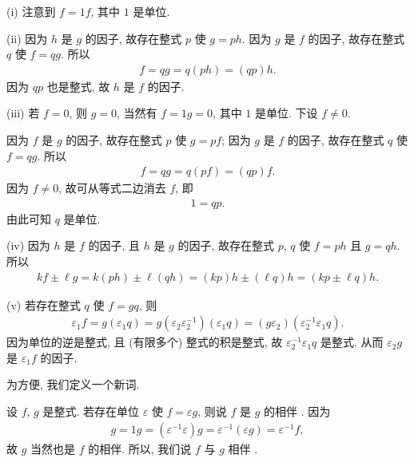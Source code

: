 \begin{pf}
    (i) 注意到 $f = 1f$, 其中 $1$ 是单位.

    (ii) 因为 $h$ 是 $g$ 的因子, 故存在整式 $p$ 使 $g = ph$. 因为 $g$ 是 $f$ 的因子, 故存在整式 $q$ 使 $f = qg$. 所以
    \begin{align*}
        f = qg = q(ph) = (qp)h.
    \end{align*}
    因为 $qp$ 也是整式, 故 $h$ 是 $f$ 的因子.

    (iii) 若 $f = 0$, 则 $g = 0$, 当然有 $f = 1 g = 0$, 其中 $1$ 是单位. 下设 $f \neq 0$.

    因为 $f$ 是 $g$ 的因子, 故存在整式 $p$ 使 $g = pf$; 因为 $g$ 是 $f$ 的因子, 故存在整式 $q$ 使 $f = qg$. 所以
    \begin{align*}
        f = qg = q(pf) = (qp)f.
    \end{align*}
    因为 $f \neq 0$, 故可从等式二边消去 $f$, 即
    \begin{align*}
        1 = qp.
    \end{align*}
    由此可知 $q$ 是单位.

    (iv) 因为 $h$ 是 $f$ 的因子, 且 $h$ 是 $g$ 的因子, 故存在整式 $p$, $q$ 使 $f = ph$ 且 $g = qh$. 所以
    \begin{align*}
        kf \pm \ell g = k(ph) \pm \ell (qh) = (kp) h \pm (\ell q) h = (kp \pm \ell q) h.
    \end{align*}

    (v) 若存在整式 $q$ 使 $f = gq$, 则
    \begin{align*}
        \varepsilon_1 f = g(\varepsilon_1 q) = g(\varepsilon_2 \varepsilon_2^{-1}) (\varepsilon_1 q) = (g\varepsilon_2) (\varepsilon_2^{-1} \varepsilon_1 q).
    \end{align*}
    因为单位的逆是整式, 且 (有限多个) 整式的积是整式, 故 $\varepsilon_2^{-1} \varepsilon_1 q$ 是整式. 从而 $\varepsilon_2 g$ 是 $\varepsilon_1 f$ 的因子.
\end{pf}

为方便, 我们定义一个新词.

\begin{definition}
    设 $f$, $g$ 是整式. 若存在单位 $\varepsilon$ 使 $f = \varepsilon g$, 则说 $f$ 是 $g$ 的相伴 . 因为
    \begin{align*}
        g = 1g = (\varepsilon^{-1} \varepsilon) g = \varepsilon^{-1} (\varepsilon g) = \varepsilon^{-1} f,
    \end{align*}
    故 $g$ 当然也是 $f$ 的相伴. 所以, 我们说 $f$ 与 $g$ 相伴 .
\end{definition}

